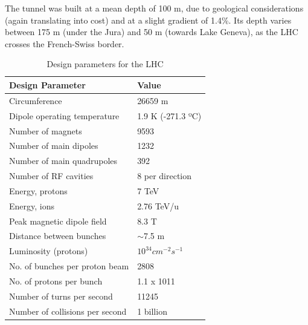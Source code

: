 The tunnel was built at a mean depth of 100 m, due to geological considerations (again translating into cost) and at a slight gradient of 1.4\%. 
Its depth varies between 175 m (under the Jura) and 50 m (towards Lake Geneva), as the LHC crosses the French-Swiss border.

\begin{table}[]
    \centering
    \begin{tabular}{|l|l|}
    \hline
    Design Parameter                & Value                                                                           \\ \hline
    Circumference                   & 26659 m                                                                        \\
    Dipole operating temperature    & 1.9 K (-271.3 ºC)                                                               \\
    Number of magnets               & 9593                                                                            \\
    Number of main dipoles          & 1232                                                                            \\
    Number of main quadrupoles      & 392                                                                             \\
    Number of RF cavities           & 8 per direction                                                                 \\
    Energy, protons                 & 7 TeV                                                                           \\
    Energy, ions                    & 2.76 TeV/u                                                                      \\
    Peak magnetic dipole field      & 8.3 T                                                                           \\
    Distance between bunches        & $\sim$7.5 m                                                                     \\
    Luminosity (protons)            & $10^{34} cm^{-2} s^{-1}$ \\
    No. of bunches per proton beam  & 2808                                                                            \\
    No. of protons per bunch        & 1.1 x 1011                                                                      \\
    Number of turns per second      & 11245                                                                           \\
    Number of collisions per second & 1 billion                                                                       \\ \hline
    \end{tabular}
    \caption{Design parameters for the LHC}
    \label{tab:LHCparam}
\end{table}

